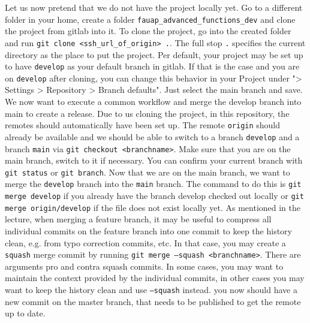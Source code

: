 \documentclass[]{erlangen-problemset}
\begin{document}

\begin{problem}[title={Cloning the project again from the remote and setting up a release}]
\noindent Let us now pretend that we do not have the project locally yet. 
Go to a different folder in your home, create a folder \texttt{fauap\_advanced\_functions\_dev} and clone the project from gitlab into it.
\Question To clone the project, go into the created folder and run \texttt{git clone <ssh_url_of_origin> .}. 
The full stop \texttt{.} specifies the current directory as the place to put the project.
Per default, your project may be set up to have \texttt{develop} as your default branch in gitlab. 
If that is the case and you are on \texttt{develop} after cloning, you can change this behavior in your Project under "> Settings > Repository > Branch defaults".
Just select the main branch and save. 
\Question We now want to execute a common workflow and merge the develop branch into main to create a release. 
Due to us cloning the project, in this repository, the remotes should automatically have been set up. 
The remote \texttt{origin} should already be available and we should be able to switch to a branch \texttt{develop} and a branch \texttt{main} via \texttt{git checkout <branchname>}.
Make sure that you are on the main branch, switch to it if necessary. 
You can confirm your current branch with \texttt{git status} or \texttt{git branch}.
Now that we are on the main branch, we want to merge the \texttt{develop} branch into the \texttt{main} branch.
The command to do this is \texttt{git merge develop} if you already have the branch develop checked out locally or \texttt{git merge origin/develop} if the file does not exist locally yet. 
As mentioned in the lecture, when merging a feature branch, it may be useful to compress all individual commits on the feature branch into one commit to keep the history clean, e.g. from typo correction commits, etc.
In that case, you may create a \texttt{squash} merge commit by running \texttt{git merge --squash <branchname>}. 
There are arguments pro and contra squash commits. 
In some cases, you may want to maintain the context provided by the individual commits, in other cases you may want to keep the history clean and use \texttt{--squash} instead. 
\Question you now should have a new commit on the master branch, that needs to be published to get the remote up to date. 

\end{problem}
\end{document}
